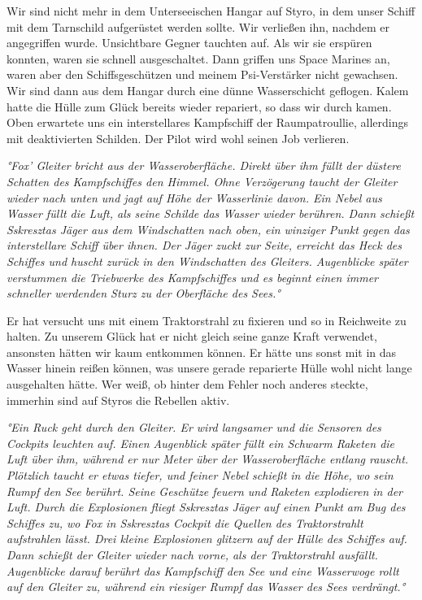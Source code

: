 \documentclass[11pt]{article}
\begin{document}
Wir sind nicht mehr in dem Unterseeischen Hangar auf Styro, in dem unser
Schiff mit dem Tarnschild aufgerüstet werden sollte. Wir verließen ihn,
nachdem er angegriffen wurde. Unsichtbare Gegner tauchten auf. Als wir
sie erspüren konnten, waren sie schnell ausgeschaltet. Dann griffen uns
Space Marines an, waren aber den Schiffsgeschützen und meinem
Psi-Verstärker nicht gewachsen. Wir sind dann aus dem Hangar durch eine
dünne Wasserschicht geflogen. Kalem hatte die Hülle zum Glück bereits
wieder repariert, so dass wir durch kamen. Oben erwartete uns ein
interstellares Kampfschiff der Raumpatroullie, allerdings mit
deaktivierten Schilden. Der Pilot wird wohl seinen Job verlieren.

\emph{°Fox' Gleiter bricht aus der Wasseroberfläche. Direkt über ihm
füllt der düstere Schatten des Kampfschiffes den Himmel. Ohne
Verzögerung taucht der Gleiter wieder nach unten und jagt auf Höhe der
Wasserlinie davon. Ein Nebel aus Wasser füllt die Luft, als seine
Schilde das Wasser wieder berühren. Dann schießt Sskresztas Jäger aus
dem Windschatten nach oben, ein winziger Punkt gegen das interstellare
Schiff über ihnen. Der Jäger zuckt zur Seite, erreicht das Heck des
Schiffes und huscht zurück in den Windschatten des Gleiters. Augenblicke
später verstummen die Triebwerke des Kampfschiffes und es beginnt einen
immer schneller werdenden Sturz zu der Oberfläche des Sees.°}

Er hat versucht uns mit einem Traktorstrahl zu fixieren und so in
Reichweite zu halten. Zu unserem Glück hat er nicht gleich seine ganze
Kraft verwendet, ansonsten hätten wir kaum entkommen können. Er hätte
uns sonst mit in das Wasser hinein reißen können, was unsere gerade
reparierte Hülle wohl nicht lange ausgehalten hätte. Wer weiß, ob hinter
dem Fehler noch anderes steckte, immerhin sind auf Styros die Rebellen
aktiv.

\emph{°Ein Ruck geht durch den Gleiter. Er wird langsamer und die
Sensoren des Cockpits leuchten auf. Einen Augenblick später füllt ein
Schwarm Raketen die Luft über ihm, während er nur Meter über der
Wasseroberfläche entlang rauscht. Plötzlich taucht er etwas tiefer, und
feiner Nebel schießt in die Höhe, wo sein Rumpf den See berührt. Seine
Geschütze feuern und Raketen explodieren in der Luft. Durch die
Explosionen fliegt Sskresztas Jäger auf einen Punkt am Bug des Schiffes
zu, wo Fox in Sskresztas Cockpit die Quellen des Traktorstrahlt
aufstrahlen lässt. Drei kleine Explosionen glitzern auf der Hülle des
Schiffes auf. Dann schießt der Gleiter wieder nach vorne, als der
Traktorstrahl ausfällt. Augenblicke darauf berührt das Kampfschiff den
See und eine Wasserwoge rollt auf den Gleiter zu, während ein riesiger
Rumpf das Wasser des Sees verdrängt.°}
\end{document}

